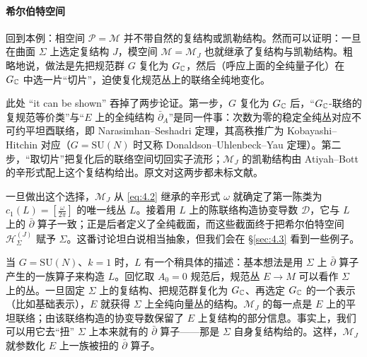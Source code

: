 \paragraph{希尔伯特空间}
回到本例：相空间 $\mathcal{P}=\mathcal{M}$ 并不带自然的复结构或凯勒结构。然而可以证明：一旦在曲面 $\Sigma$ 上选定复结构 $J$，模空间 $\mathcal{M}=\mathcal{M}_J$ 也就继承了复结构与凯勒结构。粗略地说，做法是先把规范群 $G$ 复化为 $G_{\mathbb{C}}$，然后（呼应上面的全纯量子化）在 $G_{\mathbb{C}}$ 中选一片“切片”，迫使复化规范丛上的联络全纯地变化。

\begin{yizhu}[含糊点]
此处 “it can be shown” 吞掉了两步论证。第一步，$G$ 复化为 $G_{\mathbb{C}}$ 后，“$G_{\mathbb{C}}$-联络的复规范等价类”与“$E$ 上的全纯结构 $\bar\partial_A$”是同一件事：次数为零的稳定全纯丛对应不可约平坦酉联络，即 Narasimhan--Seshadri 定理，其高秩推广为 Kobayashi--Hitchin 对应（$G=\mathrm{SU}(N)$ 时又称 Donaldson--Uhlenbeck--Yau 定理）。第二步，“取切片”把复化后的联络空间切回实子流形；$\mathcal{M}_J$ 的凯勒结构由 Atiyah--Bott \cite{atiyahbott1982} 的辛形式配上这个复结构给出。原文对这两步都未标文献。
\end{yizhu}

一旦做出这个选择，$\mathcal{M}_J$ 从 \eqref{eq:4.2} 继承的辛形式 $\omega$ 就确定了第一陈类为 $c_1(L)=[\frac{\omega}{2\pi}]$ 的唯一线丛 $L$。接着用 $L$ 上的陈联络构造协变导数 $\mathcal{D}$，它与 $L$ 上的 $\bar\partial$ 算子一致；正是后者定义了全纯截面，而这些截面终于把希尔伯特空间 $\mathcal{H}_\Sigma^{(J)}$ 赋予 $\Sigma$。这番讨论坦白说相当抽象，但我们会在 \S\ref{sec:4.3} 看到一些例子。

当 $G=\mathrm{SU}(N)$、$k=1$ 时，$L$ 有一个稍具体的描述：基本想法是用 $\Sigma$ 上 $\bar\partial$ 算子产生的一族算子来构造 $L$。回忆取 $A_0=0$ 规范后，规范丛 $E\to M$ 可以看作 $\Sigma$ 上的丛。一旦固定 $\Sigma$ 上的复结构、把规范群复化为 $G_{\mathbb{C}}$、再选定 $G_{\mathbb{C}}$ 的一个表示（比如基础表示），$E$ 就获得 $\Sigma$ 上全纯向量丛的结构。$\mathcal{M}_J$ 的每一点是 $E$ 上的平坦联络；由该联络构造的协变导数保留了 $E$ 上复结构的部分信息。事实上，我们可以用它去“扭” $\Sigma$ 上本来就有的 $\bar\partial$ 算子——那是 $\Sigma$ 自身复结构给的。这样，$\mathcal{M}_J$ 就参数化 $E$ 上一族被扭的 $\bar\partial$ 算子。

